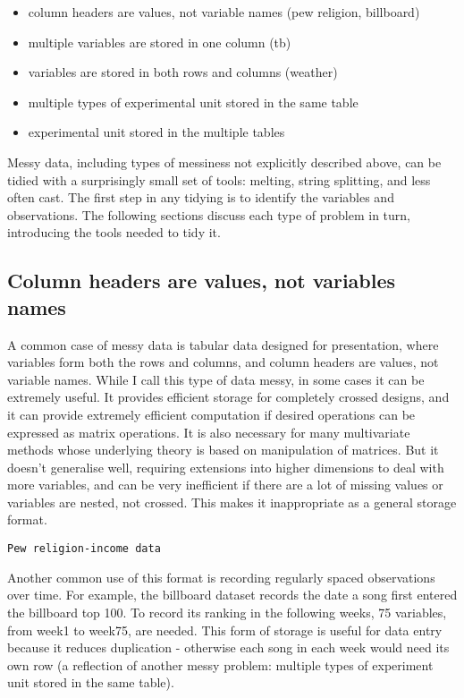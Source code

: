 \documentclass[oneside]{article}
\begin{document}
\begin{itemize}

\item column headers are values, not variable names (pew religion, billboard)
\item multiple variables are stored in one column (tb)
\item variables are stored in both rows and columns (weather)
\item multiple types of experimental unit stored in the same table
\item experimental unit stored in the multiple tables
\end{itemize}

Messy data, including types of messiness not explicitly described above, can be tidied with a surprisingly small set of tools: melting, string splitting, and less often cast. The first step in any tidying is to identify the variables and observations. The following sections discuss each type of problem in turn, introducing the tools needed to tidy it.

\subsection{Column headers are values, not variables names}

A common case of messy data is tabular data designed for presentation, where variables form both the rows and columns, and column headers are values, not variable names. While I call this type of data messy, in some cases it can be extremely useful. It provides efficient storage for completely crossed designs, and it can provide extremely efficient computation if desired operations can be expressed as matrix operations. It is also necessary for many multivariate methods whose underlying theory is based on manipulation of matrices. But it doesn't generalise well, requiring extensions into higher dimensions to deal with more variables, and can be very inefficient if there are a lot of missing values or variables are nested, not crossed. This makes it inappropriate as a general storage format.

\begin{verbatim}
Pew religion-income data
\end{verbatim}

Another common use of this format is recording regularly spaced observations over time. For example, the billboard dataset records the date a song first entered the billboard top 100. To record its ranking in the following weeks, 75 variables, from week1 to week75, are needed. This form of storage is useful for data entry because it reduces duplication - otherwise each song in each week would need its own row (a reflection of another messy problem: multiple types of experiment unit stored in the same table).
\end{document}
